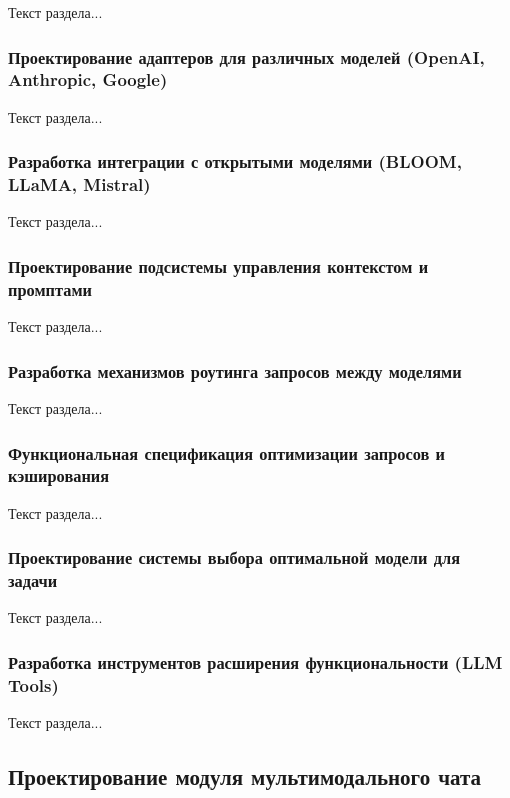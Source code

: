 Текст раздела...

\subsubsection{Проектирование адаптеров для различных моделей (OpenAI, Anthropic, Google)}

Текст раздела...

\subsubsection{Разработка интеграции с открытыми моделями (BLOOM, LLaMA, Mistral)}

Текст раздела...

\subsubsection{Проектирование подсистемы управления контекстом и промптами}

Текст раздела...

\subsubsection{Разработка механизмов роутинга запросов между моделями}

Текст раздела...

\subsubsection{Функциональная спецификация оптимизации запросов и кэширования}

Текст раздела...

\subsubsection{Проектирование системы выбора оптимальной модели для задачи}

Текст раздела...

\subsubsection{Разработка инструментов расширения функциональности (LLM Tools)}

Текст раздела...

\subsection{Проектирование модуля мультимодального чата}

